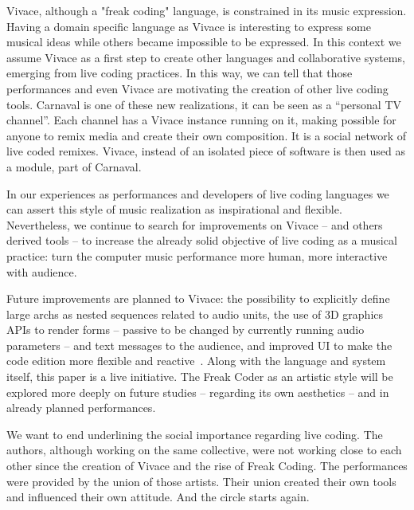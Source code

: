 \documentclass[letterpaper, 12pt]{article}
\begin{document}
Vivace, although a "freak coding" language, is constrained in its
music expression. Having a domain specific language as Vivace is
interesting to express some musical ideas while others became
impossible to be expressed. In this context we assume Vivace as a
first step to create other languages and collaborative systems,
emerging from live coding practices. In this way, we can tell that
those performances and even Vivace are motivating the creation of
other live coding tools. Carnaval is one of these new realizations, it
can be seen as a ``personal TV channel''. Each channel has a Vivace
instance running on it, making possible for anyone to remix media and
create their own composition. It is a social network of live coded
remixes. Vivace, instead of an isolated piece of software is then used
as a module, part of Carnaval.

In our experiences as performances and developers of live coding
languages we can assert this style of music realization as
inspirational and flexible. Nevertheless, we continue to search for
improvements on Vivace -- and others derived tools -- to increase the
already solid objective of live coding as a musical practice: turn the
computer music performance more human, more interactive with audience.

Future improvements are planned to Vivace: the possibility to
explicitly define large archs as nested sequences related to audio
units, the use of 3D graphics APIs to render forms -- passive to be
changed by currently running audio parameters -- and text messages to
the audience, and improved UI to make the code edition more flexible
and reactive~\citep*{brett}.  Along with the language and system
itself, this paper is a live initiative. The Freak Coder as an
artistic style will be explored more deeply on future studies --
regarding its own aesthetics -- and in already planned performances.

We want to end underlining the social importance regarding live
coding. The authors, although working on the same collective, were not
working close to each other since the creation of Vivace and the rise
of Freak Coding. The performances were provided by the union of those
artists. Their union created their own tools and influenced their own
attitude. And the circle starts again.



\end{document}
